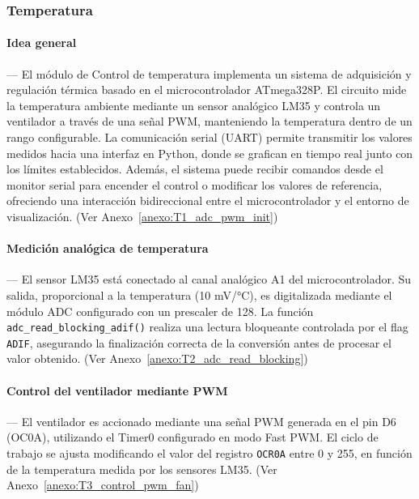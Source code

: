 \vspace{1em}

\subsubsection{\textbf{Temperatura}}

\paragraph*{\textbf{Idea general}}---
El módulo de Control de temperatura implementa un sistema de adquisición y regulación térmica basado en el microcontrolador ATmega328P. El circuito mide la temperatura ambiente mediante un sensor analógico LM35 y controla un ventilador a través de una señal PWM, manteniendo la temperatura dentro de un rango configurable. La comunicación serial (UART) permite transmitir los valores medidos hacia una interfaz en Python, donde se grafican en tiempo real junto con los límites establecidos. Además, el sistema puede recibir comandos desde el monitor serial para encender el control o modificar los valores de referencia, ofreciendo una interacción bidireccional entre el microcontrolador y el entorno de visualización. (Ver Anexo~\ref{anexo:T1_adc_pwm_init})

\vspace{1em}

\paragraph*{\textbf{Medición analógica de temperatura}}---
El sensor LM35 está conectado al canal analógico A1 del microcontrolador. Su salida, proporcional a la temperatura (10 mV/°C), es digitalizada mediante el módulo ADC configurado con un prescaler de 128. La función \texttt{adc\_read\_blocking\_adif()} realiza una lectura bloqueante controlada por el flag \texttt{ADIF}, asegurando la finalización correcta de la conversión antes de procesar el valor obtenido. (Ver Anexo~\ref{anexo:T2_adc_read_blocking})

\vspace{1em}

\paragraph*{\textbf{Control del ventilador mediante PWM}}---
El ventilador es accionado mediante una señal PWM generada en el pin D6 (OC0A), utilizando el Timer0 configurado en modo Fast PWM. El ciclo de trabajo se ajusta modificando el valor del registro \texttt{OCR0A} entre 0 y 255, en función de la temperatura medida por los sensores LM35. (Ver Anexo~\ref{anexo:T3_control_pwm_fan})

